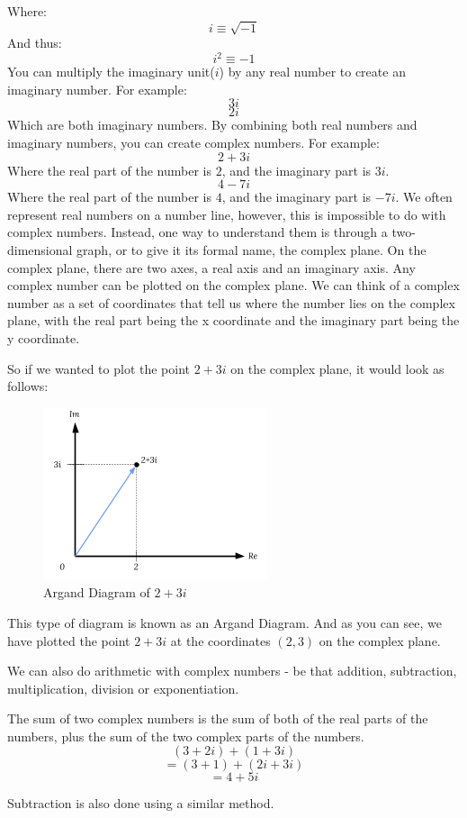 \documentclass[12pt]{article}
\begin{document}
Where: $$i \equiv \sqrt{-1}$$
And thus: $$i^2 \equiv -1$$
You can multiply the imaginary unit($i$) by any real number to create an imaginary number. For example:
$$3i$$
$$2i$$
Which are both imaginary numbers.
By combining both real numbers and imaginary numbers, you can create complex numbers.
For example:
$$2+3i$$
Where the real part of the number is $2$, and the imaginary part is $3i$.
$$4-7i$$
Where the real part of the number is $4$, and the imaginary part is $-7i$.
We often represent real numbers on a number line, however, this is impossible to do with complex numbers. Instead, one way to understand them is through a two-dimensional graph, or to give it its formal name, the complex plane. On the complex plane, there are two axes, a real axis and an imaginary axis. Any complex number can be plotted on the complex plane. We can think of a complex number as a set of coordinates that tell us where the number lies on the complex plane, with the real part being the x coordinate and the imaginary part being the y coordinate.

So if we wanted to plot the point $2+3i$ on the complex plane, it would look as follows:

\begin{figure}[ht]
    \centering
    \includegraphics[scale=1]{argand diagram 23i}
    \caption{Argand Diagram of $2+3i$}
\end{figure}

This type of diagram is known as an Argand Diagram. And as you can see, we have plotted the point $2+3i$ at the coordinates $(2, 3)$ on the complex plane.

We can also do arithmetic with complex numbers - be that addition, subtraction, multiplication, division or exponentiation.

The sum of two complex numbers is the sum of both of the real parts of the numbers, plus the sum of the two complex parts of the numbers.
$$(3+2i) + (1+3i)$$
$$= (3+1) + (2i+3i)$$
$$= 4 + 5i$$

Subtraction is also done using a similar method.
\end{document}
